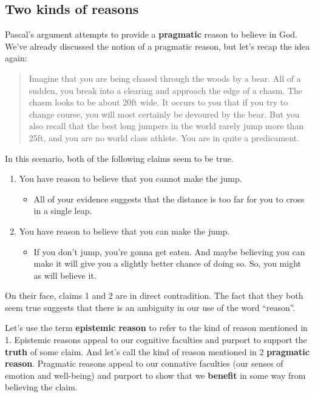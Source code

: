 \documentclass[letterpaper,10pt]{article}
\begin{document}
\subsection{Two kinds of reasons}
Pascal's argument attempts to provide a \textbf{pragmatic} reason to believe in God.  We've already discussed the notion of a pragmatic reason, but let's recap the idea again:

\begin{quote}
Imagine that you are being chased through the woods by a bear.  All of a sudden, you break into a clearing and approach the edge of a chasm.  The chasm looks to be about 20ft wide. It occurs to you that if you try to change course, you will most certainly be devoured by the bear.  But you also recall that the best long jumpers in the world rarely jump more than 25ft, and you are no world class athlete. You are in quite a predicament.
\end{quote}

In this scenario, both of the following claims seem to be true.
\begin{enumerate}
 \item You have reason to believe that you cannot make the jump.
 \begin{itemize}
  \item All of your evidence suggests that the distance is too far for you to cross in a single leap.
 \end{itemize}
 \item You have reason to believe that you can make the jump.
 \begin{itemize}
  \item If you don't jump, you're gonna get eaten.  And maybe believing you can make it will give you a slightly better chance of doing so. So, you might as will believe it.
 \end{itemize}
\end{enumerate}

On their face, claims 1 and 2 are in direct contradition. The fact that they both seem true suggests that there is an ambiguity in our use of the word ``reason''.

Let's use the term \textbf{epistemic reason} to refer to the kind of reason mentioned in 1.  Epistemic reasons appeal to our cognitive faculties and purport to support the \textbf{truth} of some claim.  And let's call the kind of reason mentioned in 2 \textbf{pragmatic reason}.  Pragmatic reasons appeal to our connative faculties (our senses of emotion and well-being) and purport to show that we \textbf{benefit} in some way from believing the claim.
\end{document}
